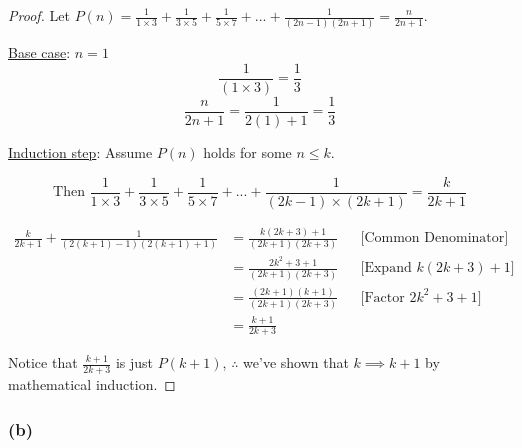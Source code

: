 \documentclass[10pt]{article}
\begin{document}
\begin{proof}
  Let $P(n) = \frac{1}{1 \times 3} + \frac{1}{3 \times 5} + \frac{1}{5 \times 7} +
  ... + \frac{1}{(2n - 1)(2n + 1)} = \frac{n}{2n + 1}$.
  \spacing

  \noindent
  \underline{Base case}: $n = 1$
  $$ \frac{1}{(1 \times 3)} = \frac{1}{3} $$
  $$ \frac{n}{2n + 1} = \frac{1}{2(1) + 1} = \frac{1}{3} $$
  \spacing

  \noindent
  \underline{Induction step}:
  Assume $P(n)$ holds for some $n \le k$.

  $$ \text{Then } \frac{1}{1 \times 3} + \frac{1}{3 \times 5} +
  \frac{1}{5 \times 7} + ... + \frac{1}{(2k - 1) \times (2k + 1)} = \frac{k}{2k + 1} $$

  \begin{align*}
    \frac{k}{2k + 1} + \frac{1}{(2(k + 1) - 1)(2(k + 1) + 1)} &=
    \frac{k(2k + 3) + 1}{(2k + 1)(2k + 3)} && \text{[Common Denominator]} \\
      &= \frac{2k^2 + 3 + 1}{(2k + 1)(2k + 3)} && \text{[Expand $k(2k + 3) + 1$]} \\
      &= \frac{(2k + 1)(k + 1)}{(2k + 1)(2k + 3)} && \text{[Factor $2k^2 + 3 + 1$]} \\
      &= \frac{k + 1}{2k + 3}
  \end{align*}

  \noindent
  Notice that $\frac{k + 1}{2k + 3}$ is just $P(k + 1)$, $\therefore$ we've shown that $k \implies k + 1$
  by mathematical induction.
\end{proof}

\subsubsection*{(b)}
\end{document}
